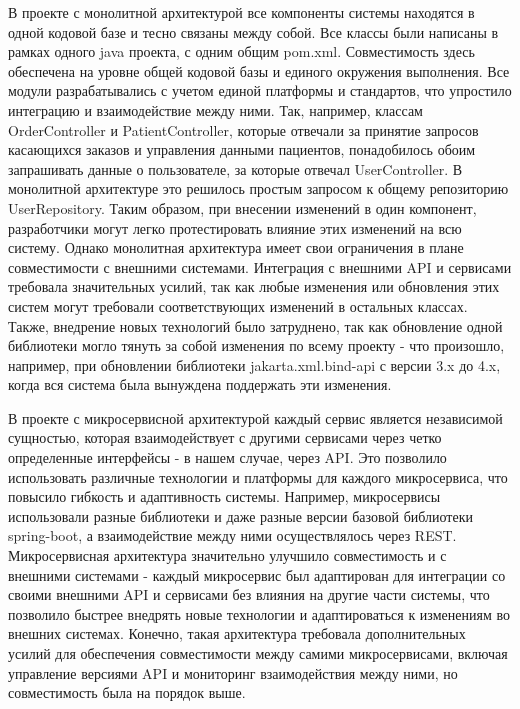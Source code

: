     В проекте с монолитной архитектурой все компоненты системы находятся в одной кодовой базе и тесно связаны между собой. Все классы были написаны в рамках одного java проекта, с одним общим pom.xml. Совместимость здесь обеспечена на уровне общей кодовой базы и единого окружения выполнения. Все модули разрабатывались с учетом единой платформы и стандартов, что упростило интеграцию и взаимодействие между ними. Так, например, классам OrderController и PatientController, которые отвечали за принятие запросов касающихся заказов и управления данными пациентов, понадобилось обоим запрашивать данные о пользователе, за которые отвечал UserController. В монолитной архитектуре это решилось простым запросом к общему репозиторию UserRepository. Таким образом, при внесении изменений в один компонент, разработчики могут легко протестировать влияние этих изменений на всю систему. Однако монолитная архитектура имеет свои ограничения в плане совместимости с внешними системами. Интеграция с внешними API и сервисами требовала значительных усилий, так как любые изменения или обновления этих систем могут требовали соответствующих изменений в остальных классах. Также, внедрение новых технологий было затруднено, так как обновление одной библиотеки могло тянуть за собой изменения по всему проекту - что произошло, например, при обновлении библиотеки jakarta.xml.bind-api с версии 3.x до 4.x, когда  вся система была вынуждена поддержать эти изменения.
    
    В проекте с микросервисной архитектурой каждый сервис является независимой сущностью, которая взаимодействует с другими сервисами через четко определенные интерфейсы - в нашем случае, через API. Это позволило использовать различные технологии и платформы для каждого микросервиса, что повысило гибкость и адаптивность системы. Например, микросервисы использовали разные библиотеки и даже разные версии базовой библиотеки spring-boot, а взаимодействие между ними осуществлялось через REST. Микросервисная архитектура значительно улучшило совместимость и с внешними системами - каждый микросервис был адаптирован для интеграции со своими внешними API и сервисами без влияния на другие части системы, что позволило быстрее внедрять новые технологии и адаптироваться к изменениям во внешних системах. Конечно, такая архитектура требовала дополнительных усилий для обеспечения совместимости между самими микросервисами, включая управление версиями API и мониторинг взаимодействия между ними, но совместимость была на порядок выше.
    
